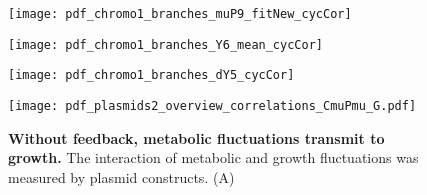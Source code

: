 \begin{figure}
	\centering
	\texttt{[image: pdf\_chromo1\_branches\_muP9\_fitNew\_cycCor]}
	\clearpage %
	\label{fig:XXX:XXX}
\end{figure}	

\clearpage



\begin{figure}
	\centering
	\texttt{[image: pdf\_chromo1\_branches\_Y6\_mean\_cycCor]}
	\clearpage %
	\label{fig:XXX:XXX}
\end{figure}	

\clearpage



\begin{figure}
	\centering
	\texttt{[image: pdf\_chromo1\_branches\_dY5\_cycCor]}
	\clearpage %
	\label{fig:XXX:XXX}
\end{figure}	

\clearpage






\begin{figure}
	\centering
	\texttt{[image: pdf\_plasmids2\_overview\_correlations\_CmuPmu\_G.pdf]}
	\caption{ 
		\textbf{Without feedback, metabolic fluctuations transmit to growth.}
		The interaction of metabolic and growth fluctuations was measured by plasmid constructs.
		(A) 
	}
	\label{fig:CRP:plasmidCCs}
\end{figure}



